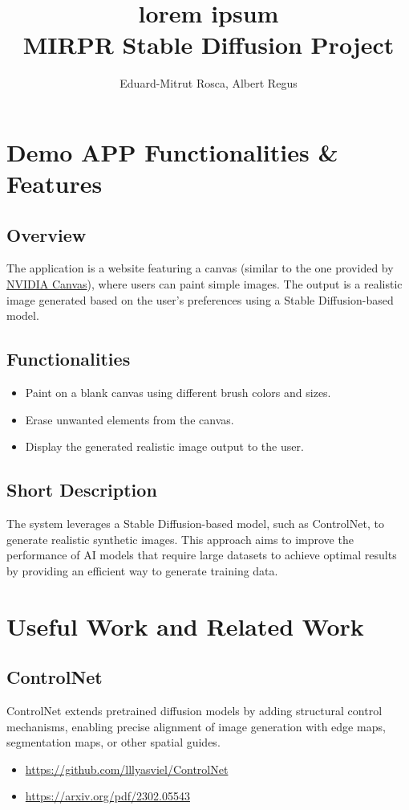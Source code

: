 \documentclass[12pt,a4paper]{report}
\title{lorem ipsum \\ \large MIRPR Stable Diffusion Project}
\author{Eduard-Mitrut Rosca, Albert Regus}
\begin{document}
\maketitle

\chapter*{Demo APP Functionalities \& Features}

\section*{Overview}
The application is a website featuring a canvas (similar to the one provided by \href{https://www.nvidia.com/en-us/studio/canvas/}{NVIDIA Canvas}), where users can paint simple images. The output is a realistic image generated based on the user’s preferences using a Stable Diffusion-based model.

\section*{Functionalities}
\begin{itemize}
    \item Paint on a blank canvas using different brush colors and sizes.
    \item Erase unwanted elements from the canvas.
    \item Display the generated realistic image output to the user.
\end{itemize}

\section*{Short Description}
The system leverages a Stable Diffusion-based model, such as ControlNet, to generate realistic synthetic images. This approach aims to improve the performance of AI models that require large datasets to achieve optimal results by providing an efficient way to generate training data.

\chapter*{Useful Work and Related Work}

\section*{ControlNet}
ControlNet extends pretrained diffusion models by adding structural control mechanisms, enabling precise alignment of image generation with edge maps, segmentation maps, or other spatial guides.
\begin{itemize}
    \item \href{https://github.com/lllyasviel/ControlNet}{https://github.com/lllyasviel/ControlNet}
    \item \href{https://arxiv.org/pdf/2302.05543}{https://arxiv.org/pdf/2302.05543}
\end{itemize}
\end{document}
